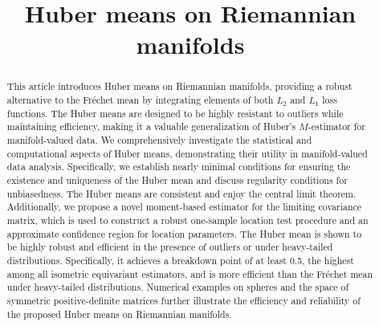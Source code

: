 \documentclass[preprint]{imsart}
\theoremstyle{plain}
\theoremstyle{remark}
\begin{document}
\begin{frontmatter}
\title{Huber means on Riemannian manifolds}


\begin{abstract}
This article introduces Huber means on Riemannian manifolds, providing a robust alternative to the Fr\'{e}chet mean by integrating elements of both $L_2$ and $L_1$ loss functions. The Huber means are designed to be highly resistant to outliers while maintaining efficiency, making it a valuable generalization of Huber's $M$-estimator for manifold-valued data. We comprehensively investigate the statistical and computational aspects of Huber means, demonstrating their utility in manifold-valued data analysis. Specifically, we establish nearly minimal conditions for ensuring the existence and uniqueness of the Huber mean and discuss regularity conditions for unbiasedness. The Huber means are consistent and enjoy the central limit theorem. Additionally, we propose a novel moment-based estimator for the limiting covariance matrix, which is used to construct a robust one-sample location test procedure and an approximate confidence region for location parameters. The Huber mean is shown to be highly robust and efficient in the presence of outliers or under heavy-tailed distributions. Specifically, it achieves a breakdown point of at least 0.5, the highest among all isometric equivariant estimators, and is more efficient than the Fr\'{e}chet mean under heavy-tailed distributions. Numerical examples on spheres and the space of symmetric positive-definite matrices further illustrate the efficiency and reliability of the proposed Huber means on Riemannian manifolds.
\end{abstract}


\end{frontmatter}
\end{document}
